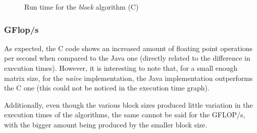 \documentclass[11pt,a4paper]{article}
\begin{document}
\begin{figure}[H]
    \centering
    \caption{Run time for the \emph{block} algorithm (C)}
\end{figure}

\subsubsection{GFlop/\unit{\second}}

As expected, the C code shows an increased amount of floating point operations per second when compared to the Java one (directly related to the difference in execution times). However, it is interesting to note that, for a small enough matrix size, for the \emph{naïve} implementation, the Java implementation outperforms the C one (this could not be noticed in the execution time graph).

Additionally, even though the various block sizes produced little variation in the execution times of the algorithms, the same cannot be said for the GFLOP/s, with the bigger amount being produced by the smaller block size.
\end{document}
